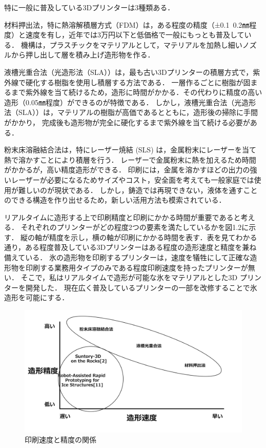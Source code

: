 特に一般に普及している3Dプリンターは3種類ある．

材料押出法，特に熱溶解積層方式（FDM）は，ある程度の精度（±0.1~0.2㎜程度）と速度を有し，近年では3万円以下と低価格で一般にもっとも普及している．
機構は，プラスチックをマテリアルとして，マテリアルを加熱し細いノズルから押し出して層を積み上げ造形物を作る．


液槽光重合法（光造形法（SLA））は，最も古い3Dプリンターの積層方式で，紫外線で硬化する樹脂を使用し積層する方法である．
一層作るごとに樹脂が固まるまで紫外線を当て続けるため，造形に時間がかかる．その代わりに精度の高い造形（0.05㎜程度）ができるのが特徴である．
しかし，液槽光重合法（光造形法（SLA））は，マテリアルの樹脂が高価であるとともに，造形後の掃除に手間がかかり，
完成後も造形物が完全に硬化するまで紫外線を当て続ける必要がある．


粉末床溶融結合法は，特にレーザー焼結 (SLS) は，金属粉末にレーザーを当て熱で溶かすことにより積層を行う．
レーザーで金属粉末に熱を加えるため時間がかかるが，高い精度造形ができる．
印刷には，金属を溶かすほどの出力の強いレーザーが必要になるためサイズやコスト，安全面を考えても一般家庭では使用が難しいのが現状である．
しかし，鋳造では再現できない，液体を通すことのできる構造を作り出せるため，新しい活用方法も模索されている．


リアルタイムに造形する上で印刷精度と印刷にかかる時間が重要であると考える．
それぞれのプリンターがどの程度2つの要素を満たしているかを図1.2に示す．
縦の軸が精度を示し，横の軸が印刷にかかる時間を表す．表を見てわかる通り，ある程度普及している3Dプリンターはある程度の造形速度と精度を兼ね備えている．
氷の造形物を印刷するプリンターは，速度を犠牲にして正確な造形物を印刷する業務用タイプのみである程度印刷速度を持ったプリンターが無い．
そこで，私はリアルタイムで造形が可能な氷をマテリアルとした3D プリンターを開発した．
現在広く普及しているプリンターの一部を改修することで氷造形を可能にする．

\begin{figure}[H]
  \centering
  \includegraphics[width=14truecm]{./fig/hyou.jpg}
  \caption{印刷速度と精度の関係}
  \label{fig:ferret}
\end{figure}

